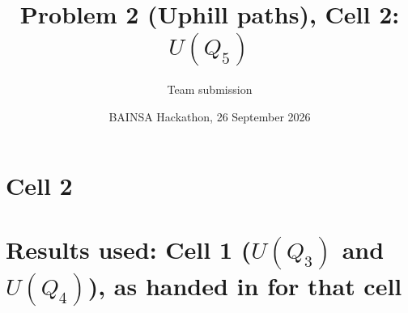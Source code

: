 
\title{Problem 2 (Uphill paths), Cell 2: $U(Q_5)$}
\author{Team submission}
\date{BAINSA Hackathon, 26 September 2026}
\maketitle
\section{Cell 2}

\appendix
\section{Results used: Cell 1 ($U(Q_3)$ and $U(Q_4)$), as handed in for that cell}



